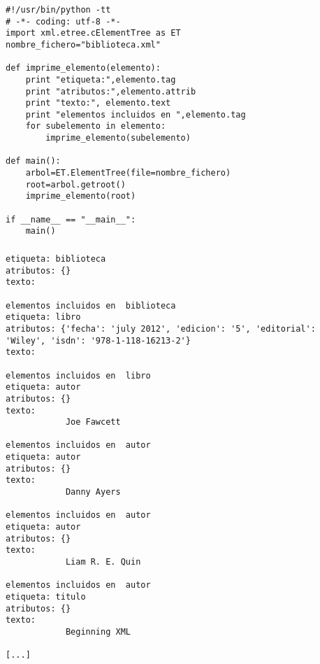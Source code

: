 \documentclass[ucs]{beamer}
\begin{document}
\begin{frame}[fragile]
\frametitle{}

  \begin{footnotesize}
  \begin{verbatim}
#!/usr/bin/python -tt
# -*- coding: utf-8 -*-
import xml.etree.cElementTree as ET
nombre_fichero="biblioteca.xml"

def imprime_elemento(elemento):
    print "etiqueta:",elemento.tag
    print "atributos:",elemento.attrib
    print "texto:", elemento.text
    print "elementos incluidos en ",elemento.tag
    for subelemento in elemento:
        imprime_elemento(subelemento)

def main():
    arbol=ET.ElementTree(file=nombre_fichero)
    root=arbol.getroot()
    imprime_elemento(root)

if __name__ == "__main__":
    main()
  \end{verbatim}
  \end{footnotesize}
\end{frame}


\begin{frame}[fragile]
\frametitle{}

  \begin{tiny}
  \begin{verbatim}
etiqueta: biblioteca
atributos: {}
texto: 
    
elementos incluidos en  biblioteca
etiqueta: libro
atributos: {'fecha': 'july 2012', 'edicion': '5', 'editorial': 'Wiley', 'isdn': '978-1-118-16213-2'}
texto: 
        
elementos incluidos en  libro
etiqueta: autor
atributos: {}
texto: 
            Joe Fawcett
        
elementos incluidos en  autor
etiqueta: autor
atributos: {}
texto: 
            Danny Ayers
        
elementos incluidos en  autor
etiqueta: autor
atributos: {}
texto: 
            Liam R. E. Quin
        
elementos incluidos en  autor
etiqueta: titulo
atributos: {}
texto: 
            Beginning XML
        
[...]
  \end{verbatim}
  \end{tiny}

\end{frame}
\end{document}
